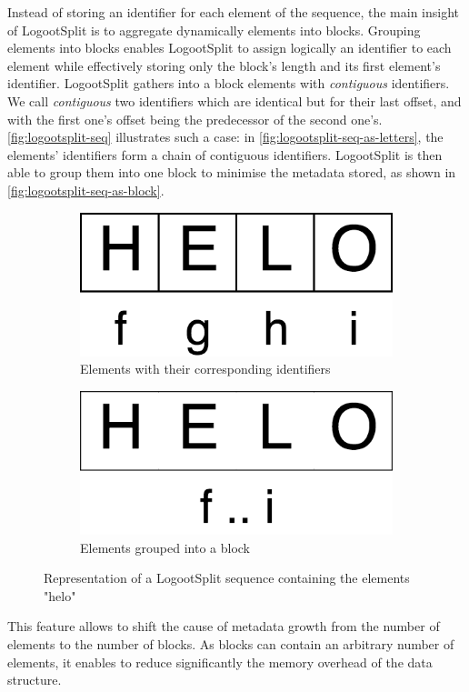 \documentclass[sigplan,10pt]{acmart}
\begin{document}
Instead of storing an identifier for each element of the sequence, the main insight of LogootSplit is to aggregate dynamically elements into blocks.
Grouping elements into blocks enables LogootSplit to assign logically an identifier to each element while effectively storing only the block's length and its first element's identifier.
LogootSplit gathers into a block elements with \emph{contiguous} identifiers.
We call \emph{contiguous} two identifiers which are identical but for their last offset, and with the first one’s offset being the predecessor of the second one's.
\autoref{fig:logootsplit-seq} illustrates such a case: in \autoref{fig:logootsplit-seq-as-letters}, the elements' identifiers form a chain of contiguous identifiers.
LogootSplit is then able to group them into one block to minimise the metadata stored, as shown in \autoref{fig:logootsplit-seq-as-block}.

\begin{figure}
    \begin{subfigure}{0.45\columnwidth}
        \centering
        \includegraphics[width=0.4\columnwidth]{img/helo-as-letters.png}
        \caption{Elements with their corresponding identifiers}
        \label{fig:logootsplit-seq-as-letters}
    \end{subfigure}
    \begin{subfigure}{0.45\columnwidth}
        \centering
        \includegraphics[width=0.4\columnwidth]{img/helo-as-block.png}
        \caption{Elements grouped into a block}
        \label{fig:logootsplit-seq-as-block}
    \end{subfigure}
    \caption{Representation of a LogootSplit sequence containing the elements "helo"}
    \label{fig:logootsplit-seq}
\end{figure}

This feature allows to shift the cause of metadata growth from the number of elements to the number of blocks.
As blocks can contain an arbitrary number of elements, it enables to reduce significantly the memory overhead of the data structure.
\end{document}
